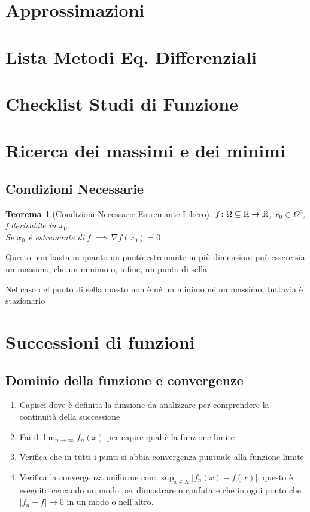 \documentclass[a4paper]{article}
\newcommand{\numberset}{\mathbb}
\newcommand{\R}{\numberset{R}}
\theoremstyle{plain}
\newtheorem{Teo}{Teorema}
\begin{document}
\section{Approssimazioni}

\section{Lista Metodi Eq. Differenziali}

\section{Checklist Studi di Funzione}

\section {Ricerca dei massimi e dei minimi}

\subsection{Condizioni Necessarie}

\begin{Teo}[Condizioni Necessarie Estremante Libero]    
    $\\f\colon\Omega\subseteq\R\to\R$, $ x_0\in\Omega^o$, f derivabile in $x_0$.\\
    Se $x_0$ è estremante di f $\implies \, \nabla f(x_0)=\bar{0}$ 
\end{Teo}

Questo non basta in quanto un punto estremante in più dimensioni può essere sia 
un massimo, che un minimo o, infine, un punto di sella 

Nel caso del punto di sella questo non è né un minimo né un massimo, tuttavia è stazionario 

\section{Successioni di funzioni}

\subsection{Dominio della funzione e convergenze}

\begin{enumerate}
    \item Capisci dove è definita la funzione da analizzare per comprendere 
    la continuità della successione
    \item Fai il $\lim_{n \to \infty} f_n(x)$ per capire qual è la funzione limite
    \item Verifica che in tutti i punti si abbia convergenza puntuale alla funzione limite
    \item Verifica la convergenza uniforme con: $\sup_{x\in E}|f_n(x)-f(x)|$,
    questo è eseguito cercando un modo per dimostrare o confutare che in ogni punto che $|f_n-f|
    \to 0$ in un modo o nell'altro. 
\end{enumerate}
\end{document}
